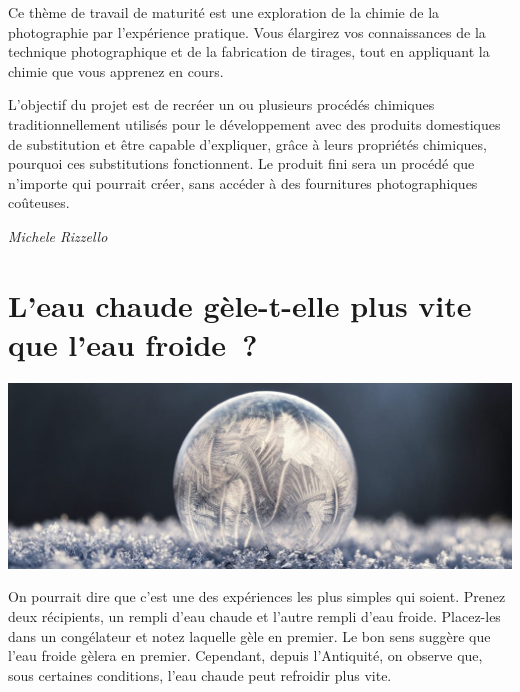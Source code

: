 \documentclass[
  10pt,
  french,
  a5paper,
  openany]{book}
\newenvironment{signature}{\begin{flushright}}{\end{flushright}}
\begin{document}
Ce thème de travail de maturité est une exploration de la chimie de la photographie par l'expérience pratique. Vous élargirez vos connaissances de la technique photographique et de la fabrication de tirages, tout en appliquant la chimie que vous apprenez en cours.

L'objectif du projet est de recréer un ou plusieurs procédés chimiques traditionnellement utilisés pour le développement avec des produits domestiques de substitution et être capable d'expliquer, grâce à leurs propriétés chimiques, pourquoi ces substitutions fonctionnent. Le produit fini sera un procédé que n'importe qui pourrait créer, sans accéder à des fournitures photographiques coûteuses.

\begin{signature}
\emph{Michele Rizzello}

\end{signature}

\hypertarget{leau-chaude-guxe8le-t-elle-plus-vite-que-leau-froide}{%
\chapter{\texorpdfstring{L'eau chaude gèle-t-elle \linebreak plus vite que l'eau froide~?}{L'eau chaude gèle-t-elle plus vite que l'eau froide~?}}\label{leau-chaude-guxe8le-t-elle-plus-vite-que-leau-froide}}

\begin{center}
\includegraphics[width=1\textwidth,height=\textheight]{images/eau-chaude.jpg}

\end{center}

On pourrait dire que c'est une des expériences les plus simples qui soient. Prenez deux récipients, un rempli d'eau chaude et l'autre rempli d'eau froide. Placez-les dans un congélateur et notez laquelle gèle en premier. Le bon sens suggère que l'eau froide gèlera en premier. Cependant, depuis l'Antiquité, on observe que, sous certaines conditions, l'eau chaude peut refroidir plus vite.
\end{document}
